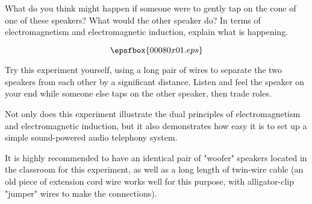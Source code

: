 

What do you think might happen if someone were to gently tap on the cone of one of these speakers?  What would the other speaker do?  In terms of electromagnetism and electromagnetic induction, explain what is happening.

$$\epsfbox{00080x01.eps}$$







Try this experiment yourself, using a long pair of wires to separate the two speakers from each other by a significant distance.  Listen and feel the speaker on your end while someone else taps on the other speaker, then trade roles.







Not only does this experiment illustrate the dual principles of electromagnetism and electromagnetic induction, but it also demonstrates how easy it is to set up a simple sound-powered audio telephony system.

It is highly recommended to have an identical pair of "woofer" speakers located in the classroom for this experiment, as well as a long length of twin-wire cable (an old piece of extension cord wire works well for this purpose, with alligator-clip "jumper" wires to make the connections).




